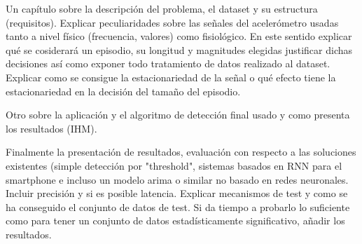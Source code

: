 \documentclass[../tfm.tex]{subfiles}
\begin{document}
Un capítulo sobre la descripción del problema, el dataset y su estructura (requisitos). Explicar peculiaridades sobre las señales del acelerómetro usadas tanto a nivel físico (frecuencia, valores) como fisiológico. En este sentido explicar qué se cosiderará un episodio, su longitud y magnitudes elegidas justificar dichas decisiones así como exponer todo tratamiento de datos realizado al dataset. Explicar como se consigue la estacionariedad de la señal o qué efecto tiene la estacionariedad en la decisión del tamaño del episodio.

Otro sobre la aplicación y el algoritmo de detección final usado y como presenta los resultados (IHM).

Finalmente la presentación de resultados, evaluación con respecto a las soluciones existentes (simple detección por "threshold", sistemas basados en RNN para el smartphone e incluso un modelo arima o similar no basado en redes neuronales. Incluir precisión y si es posible latencia. Explicar mecanismos de test y como se ha conseguido el conjunto de datos de test. Si da tiempo a probarlo lo suficiente como para tener un conjunto de datos estadísticamente significativo, añadir los resultados.
\end{document}
